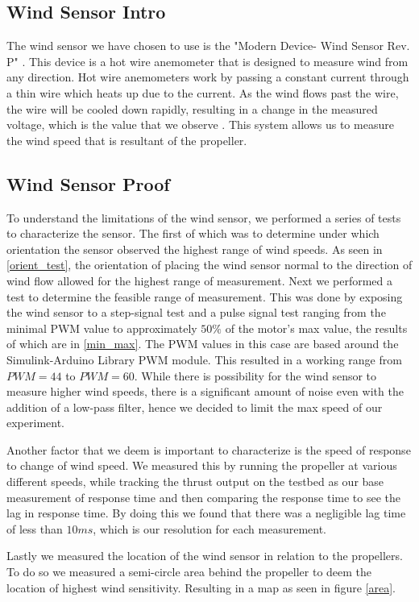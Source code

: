 \documentclass[twocolumn]{article}
\begin{document}
	\subsection{Wind Sensor Intro}
	The wind sensor we have chosen to use is the "Modern Device- Wind Sensor Rev. P" \cite{wind_sensor}. This device is a hot wire anemometer that is designed to measure wind from any direction. Hot wire anemometers work by passing a constant current through a thin wire which heats up due to the current. As the wind flows past the wire, the wire will be cooled down rapidly, resulting in a change in the measured voltage, which is the value that we observe \cite{hot_wire}. This system allows us to measure the wind speed that is resultant of the propeller. 
	\subsection{Wind Sensor Proof}
	To understand the limitations of the wind sensor, we performed a series of tests to characterize the sensor. The first of which was to determine under which orientation the sensor observed the highest range of wind speeds. As seen in \ref{orient_test}, the orientation of placing the wind sensor normal to the direction of wind flow allowed for the highest range of measurement. Next we performed a test to determine the feasible range of measurement. This was done by exposing the wind sensor to a step-signal test and a pulse signal test ranging from the minimal PWM value to approximately $50\%$ of the motor's max value, the results of which are in \ref{min_max}. The PWM values in this case are based around the Simulink-Arduino Library PWM module.  This resulted in a working range from $PWM = 44$ to $PWM = 60$. While there is possibility for the wind sensor to measure higher wind speeds, there is a significant amount of noise even with the addition of a low-pass filter, hence we decided to limit the max speed of our experiment. 
	
	Another factor that we deem is important to characterize is the speed of response to change of wind speed. We measured this by running the propeller at various different speeds, while tracking the thrust output on the testbed as our base measurement of response time and then comparing the response time to see the lag in response time. By doing this we found that there was a negligible lag time of less than $10 ms$, which is our resolution for each measurement.
	 
	Lastly we measured the location of the wind sensor in relation to the propellers. To do so we measured a semi-circle area behind the propeller to deem the location of highest wind sensitivity. Resulting in a map as seen in figure \ref{area}. 
	
\end{document}
